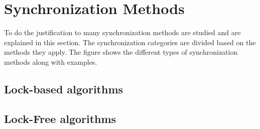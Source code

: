 \section{Synchronization Methods}

To do the justification to many synchronization methods are studied and are explained in this section. The synchronization categories are divided based on the methods they apply. 
The figure %
shows the different types of synchronization methods along with examples. 

\subsection{Lock-based algorithms}

\subsection{Lock-Free algorithms}
